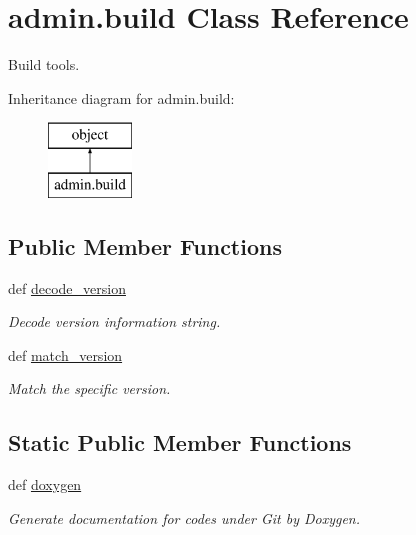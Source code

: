 \hypertarget{classadmin_1_1build}{\section{admin.\-build Class Reference}
\label{classadmin_1_1build}
}


Build tools.  


Inheritance diagram for admin.\-build\-:\begin{figure}[H]
\begin{center}
\leavevmode
\includegraphics[height=2.000000cm]{d8/dff/classadmin_1_1build}
\end{center}
\end{figure}
\subsection*{Public Member Functions}
\begin{DoxyCompactItemize}
\item 
def \hyperlink{classadmin_1_1build_a265731c57c5b23175db096bf8a76e236}{decode\-\_\-version}
\begin{DoxyCompactList}\small\item\em Decode version information string. \end{DoxyCompactList}\item 
def \hyperlink{classadmin_1_1build_a119269530e1f9f01afc87834d21d722b}{match\-\_\-version}
\begin{DoxyCompactList}\small\item\em Match the specific version. \end{DoxyCompactList}\end{DoxyCompactItemize}
\subsection*{Static Public Member Functions}
\begin{DoxyCompactItemize}
\item 
def \hyperlink{classadmin_1_1build_add65d88734d0ae6b83e8c31cff366b68}{doxygen}
\begin{DoxyCompactList}\small\item\em Generate documentation for codes under Git by Doxygen. \end{DoxyCompactList}\end{DoxyCompactItemize}
